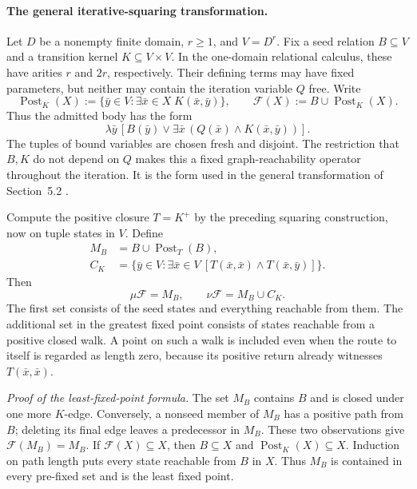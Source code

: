 \paragraph{The general iterative-squaring transformation.}
Let \(D\) be a nonempty finite domain, \(r\geq1\), and \(V=D^r\).
Fix a seed relation \(B\subseteq V\) and a transition kernel
\(K\subseteq V\times V\). In the one-domain relational calculus,
these have arities \(r\) and \(2r\), respectively. Their defining
terms may have fixed parameters, but neither may contain the
iteration variable \(Q\) free. Write
\[
 \operatorname{Post}_K(X)
   :=\{\bar y\in V:\exists\bar x\in X\;K(\bar x,\bar y)\},
 \qquad
 \mathcal F(X):=B\cup\operatorname{Post}_K(X).
\]
Thus the admitted body has the form
\[
 \lambda\bar y\,
   [B(\bar y)\lor
      \exists\bar x\,(Q(\bar x)\land K(\bar x,\bar y))].
\]
The tuples of bound variables are chosen fresh and disjoint.
The restriction that \(B,K\) do not depend on \(Q\) makes this a
fixed graph-reachability operator throughout the iteration.
It is the form used in the general transformation of
Section~5.2 \cite[\S5.2, thms.~2--3]{BurchEtAl1992}.

Compute the positive closure \(T=K^+\) by the preceding squaring
construction, now on tuple states in \(V\). Define
\[
\begin{aligned}
 M_B&=B\cup\operatorname{Post}_T(B),\\
 C_K&=\{\bar y\in V:\exists\bar x\in V\
                 [T(\bar x,\bar x)\land T(\bar x,\bar y)]\}.
\end{aligned}
\]
Then
\[
 \mu\mathcal F=M_B,\qquad
 \nu\mathcal F=M_B\cup C_K.
\]
The first set consists of the seed states and everything reachable
from them. The additional set in the greatest fixed point consists
of states reachable from a positive closed walk. A point on such
a walk is included even when the route to itself is regarded as
length zero, because its positive return already witnesses
\(T(\bar x,\bar x)\).

\emph{Proof of the least-fixed-point formula.}
The set \(M_B\) contains \(B\) and is closed under one more
\(K\)-edge. Conversely, a nonseed member of \(M_B\) has a
positive path from \(B\); deleting its final edge leaves a
predecessor in \(M_B\). These two observations give
\(\mathcal F(M_B)=M_B\).
If \(\mathcal F(X)\subseteq X\), then \(B\subseteq X\) and
\(\operatorname{Post}_K(X)\subseteq X\). Induction on path
length puts every state reachable from \(B\) in \(X\).
Thus \(M_B\) is contained in every pre-fixed set and is the
least fixed point.

